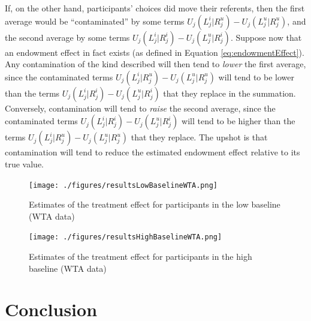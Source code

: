 \documentclass[12pt]{article}
\begin{document}
If, on the other hand, participants' choices did move their referents, then the first average would be \enquote{contaminated} by some terms $U_j(L_j^i|R_j^u)-U_j(L_j^u|R_j^u)$, and the second average by some terms $U_j(L_j^i|R_j^i)-U_j(L_j^u|R_j^i)$. Suppose now that an endowment effect in fact exists (as defined in Equation \ref{eq:endowmentEffect}). Any contamination of the kind described will then tend to \emph{lower} the first average, since the contaminated terms $U_j(L_j^i|R_j^u)-U_j(L_j^u|R_j^u)$ will tend to be lower than the terms $U_j(L_j^i|R_j^i)-U_j(L_j^u|R_j^i)$ that they replace in the summation. Conversely, contamination will tend to \emph{raise} the second average, since the contaminated terms $U_j(L_j^i|R_j^i)-U_j(L_j^u|R_j^i)$ will tend to be higher than the terms $U_j(L_j^i|R_j^u)-U_j(L_j^u|R_j^u)$ that they replace. The upshot is that contamination will tend to reduce the estimated endowment effect relative to its true value.


\begin{figure}[ht]
  \caption{Estimates of the treatment effect for participants in the low baseline (WTA data)}\label{fig:resultsLowBaselineWTA}
  \begin{center}
  {\texttt{[image: ./figures/resultsLowBaselineWTA.png]}}
  \end{center}
\end{figure}





\begin{figure}[ht]
  \caption{Estimates of the treatment effect for participants in the high baseline (WTA data)}\label{fig:resultsHighBaselineWTA}
  \begin{center}
  {\texttt{[image: ./figures/resultsHighBaselineWTA.png]}}
  \end{center}
\end{figure}








\section{Conclusion}
\end{document}
